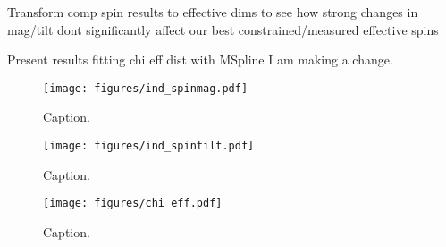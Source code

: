 Transform comp spin results to effective dims to see how strong changes in mag/tilt dont significantly affect our best constrained/measured
effective spins

Present results fitting chi eff dist with MSpline I am making a change. 

\begin{figure}
    \texttt{[image: figures/ind\_spinmag.pdf]}
    \caption{Caption.}
    \label{fig:ind_spinmag_dist}
\end{figure}

\begin{figure}
        \texttt{[image: figures/ind\_spintilt.pdf]}
        \caption{Caption.}
        \label{fig:ind_spintilt_dist}
\end{figure}


\begin{figure}
    \texttt{[image: figures/chi\_eff.pdf]}
    \caption{Caption.}
    \label{fig:chieff_dist}
\end{figure}